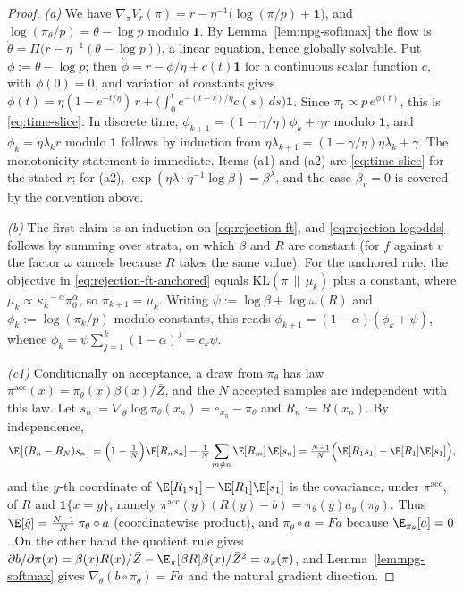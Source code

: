 \begin{proof}
\emph{(a)} We have
$\nabla_\pi V_r(\pi)=r-\eta^{-1}\bigl(\log(\pi/p)+\mathbf 1\bigr)$, and
$\log(\pi_\theta/p)=\theta-\log p$ modulo $\mathbf 1$. By
Lemma~\ref{lem:npg-softmax} the flow is
$\dot\theta=\Pi\bigl(r-\eta^{-1}(\theta-\log p)\bigr)$, a linear equation,
hence globally solvable. Put $\phi:=\theta-\log p$; then
$\dot\phi=r-\phi/\eta+c(t)\mathbf 1$ for a continuous scalar function $c$,
with $\phi(0)=0$, and variation of constants gives
$\phi(t)=\eta(1-e^{-t/\eta})\,r+\bigl(\int_0^te^{-(t-s)/\eta}c(s)\,ds\bigr)\mathbf 1$.
Since $\pi_t\propto p\,e^{\phi(t)}$, this is \eqref{eq:time-slice}. In
discrete time, $\phi_{k+1}=(1-\gamma/\eta)\phi_k+\gamma r$ modulo
$\mathbf 1$, and $\phi_k=\eta\lambda_kr$ modulo $\mathbf 1$ follows by
induction from $\eta\lambda_{k+1}=(1-\gamma/\eta)\eta\lambda_k+\gamma$. The
monotonicity statement is immediate. Items (a1) and (a2) are
\eqref{eq:time-slice} for the stated $r$; for (a2),
$\exp(\eta\lambda\cdot\eta^{-1}\log\beta)=\beta^{\lambda}$, and the case
$\beta_v=0$ is covered by the convention above.

\emph{(b)} The first claim is an induction on \eqref{eq:rejection-ft}, and
\eqref{eq:rejection-logodds} follows by summing over strata, on which
$\beta$ and $R$ are constant (for $f$ against $v$ the factor $\omega$
cancels because $R$ takes the same value). For the anchored rule, the
objective in \eqref{eq:rejection-ft-anchored} equals
$\mathrm{KL}(\pi\,\|\,\mu_k)$ plus a constant, where
$\mu_k\propto\kappa_k^{1-\alpha}\pi_0^{\alpha}$, so
$\pi_{k+1}=\mu_k$. Writing $\psi:=\log\beta+\log\omega(R)$ and
$\phi_k:=\log(\pi_k/p)$ modulo constants, this reads
$\phi_{k+1}=(1-\alpha)(\phi_k+\psi)$, whence
$\phi_k=\psi\sum_{j=1}^k(1-\alpha)^j=c_k\psi$.

\emph{(c1)} Conditionally on acceptance, a draw from $\pi_\theta$ has law
$\pi^{\mathrm{acc}}(x)=\pi_\theta(x)\beta(x)/\bar Z$, and the $N$ accepted
samples are independent with this law. Let
$s_n:=\nabla_\theta\log\pi_\theta(x_n)=e_{x_n}-\pi_\theta$ and
$R_n:=R(x_n)$. By independence,
\[
\E\bigl[(R_n-\bar R_N)s_n\bigr]
=\Bigl(1-\tfrac1N\Bigr)\E[R_ns_n]-\tfrac1N\sum_{m\ne n}\E[R_m]\,\E[s_n]
=\tfrac{N-1}{N}\Bigl(\E[R_1s_1]-\E[R_1]\E[s_1]\Bigr),
\]
and the $y$-th coordinate of $\E[R_1s_1]-\E[R_1]\E[s_1]$ is the covariance,
under $\pi^{\mathrm{acc}}$, of $R$ and $\mathbf 1\{x=y\}$, namely
$\pi^{\mathrm{acc}}(y)(R(y)-b)=\pi_\theta(y)a_y(\pi_\theta)$. Thus
$\E[\hat g]=\frac{N-1}{N}\,\pi_\theta\circ a$ (coordinatewise product), and
$\pi_\theta\circ a=Fa$ because $\E_{\pi_\theta}[a]=0$. On the other hand the
quotient rule gives
$\partial b/\partial\pi(x)=\beta(x)R(x)/\bar Z-\E_\pi[\beta R]\beta(x)/\bar Z^{2}=a_x(\pi)$,
and Lemma~\ref{lem:npg-softmax} gives
$\nabla_\theta(b\circ\pi_\theta)=Fa$ and the natural gradient direction.


\end{proof}

